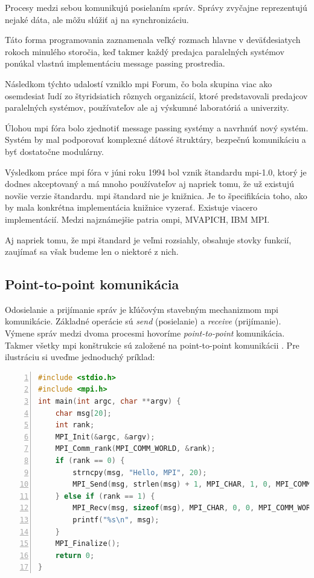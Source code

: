 Procesy medzi sebou komunikujú posielaním správ.
Správy zvyčajne reprezentujú nejaké dáta, ale môžu slúžiť aj na synchronizáciu.

Táto forma programovania zaznamenala veľký rozmach hlavne v deväťdesiatych rokoch minulého storočia,
keď takmer každý predajca paralelných systémov ponúkal vlastnú implementáciu message passing prostredia.

Následkom týchto udalostí vzniklo \acrfull{mpi} Forum, čo bola skupina viac ako osemdesiat ľudí zo štyridsiatich rôznych organizácií,
ktoré predstavovali predajcov paralelných systémov, používateľov ale aj výskumné laboratóriá a univerzity. \cite{mpibook}

Úlohou \acrshort{mpi} fóra bolo zjednotiť message passing systémy a navrhnúť nový systém.
Systém by mal podporovať komplexné dátové štruktúry, bezpečnú komunikáciu a byť dostatočne modulárny.

Výsledkom práce \acrshort{mpi} fóra v júni roku 1994 bol vznik štandardu \acrshort{mpi}-1.0,
ktorý je dodnes akceptovaný a má mnoho používateľov aj napriek tomu, že už existujú novšie verzie štandardu.
\acrshort{mpi} štandard nie je knižnica. Je to špecifikácia toho, ako by mala konkrétna implementácia knižnice vyzerať.
Existuje viacero implementácií. Medzi najznámejšie patria \acrshort{ompi}, MVAPICH, IBM MPI.

Aj napriek tomu, že \acrshort{mpi} štandard je veľmi rozsiahly, obsahuje stovky funkcií, zaujímať sa však budeme len o niektoré z nich.

\subsection{Point-to-point komunikácia}
Odosielanie a prijímanie správ je kľúčovým stavebným mechanizmom \acrshort{mpi} komunikácie.
Základné operácie sú \textit{send} (posielanie) a \textit{receive} (prijímanie).
Výmene správ medzi dvoma procesmi hovoríme \textit{point-to-point} komunikácia.
Takmer všetky \acrshort{mpi} konštrukcie sú založené na point-to-point komunikácii \cite{mpi3-1}.
Pre ilustráciu si uveďme jednoduchý príklad:

\begin{lstlisting}[language=c, caption={Point-to-point komunikácia}, label={mpi:1}, numbers=left]
#include <stdio.h>
#include <mpi.h>
int main(int argc, char **argv) {
    char msg[20];
    int rank;
    MPI_Init(&argc, &argv);
    MPI_Comm_rank(MPI_COMM_WORLD, &rank);
    if (rank == 0) {
        strncpy(msg, "Hello, MPI", 20);
        MPI_Send(msg, strlen(msg) + 1, MPI_CHAR, 1, 0, MPI_COMM_WORLD);
    } else if (rank == 1) {
        MPI_Recv(msg, sizeof(msg), MPI_CHAR, 0, 0, MPI_COMM_WORLD, MPI_STATUS_IGNORE);
        printf("%s\n", msg);
    }
    MPI_Finalize();
    return 0;
}
\end{lstlisting}

